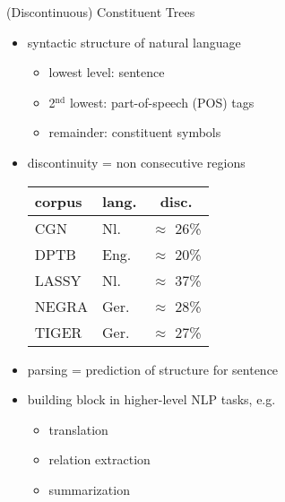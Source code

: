 \documentclass[slides]{subfiles}
\begin{document}
    \begin{frame}[label=working]{(Discontinuous) Constituent Trees}
        \begin{minipage}{.4\linewidth}
            \resizebox{\linewidth}{!}{
                }
        \end{minipage}
        \begin{minipage}{.58\linewidth}
            \begin{itemize}
                \item<+-> syntactic structure of natural language
                \begin{itemize}
                    \item<+-> lowest level: sentence
                    \item<+-> 2\(^\text{nd}\) lowest: part-of-speech (POS) tags
                    \item<+-> remainder: constituent symbols
                \end{itemize}
                \item<+-> discontinuity = non consecutive regions
                {\scriptsize\centering\begin{tabular}{llc}
                    \toprule
                    corpus & lang. & disc.\\%
                    \midrule
                    CGN \citep{hoekstra2001syntactic}  & Nl.       & $\approx$ 26\% \\
                    DPTB  \citep{EvaKal11}             & Eng.      & $\approx$ 20\% \\
                    LASSY \citep{Noord09}              & Nl.       & $\approx$ 37\% \\
                    NEGRA \citep{Skut98}               & Ger.      & $\approx$ 28\% \\
                    TIGER \citep{Brants04}             & Ger.      & $\approx$ 27\% \\
                    \bottomrule
                \end{tabular}}
                \item<+-> parsing = prediction of structure for sentence
                \item<+-> building block in higher-level NLP tasks, e.g.\@
                \begin{itemize}
                    \item translation \citep{Zhang19, Yang22}
                    \item relation extraction \citep{Nguyen19}
                    \item summarization \citep{Balachandran21}
                \end{itemize}
            \end{itemize}
        \end{minipage}
    \end{frame}
\end{document}
